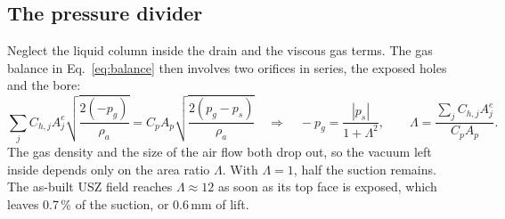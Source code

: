 \documentclass[10pt,a4paper]{article}
\begin{document}
\subsection{The pressure divider}
Neglect the liquid column inside the drain and the viscous gas terms. The gas balance in Eq.~\eqref{eq:balance} then involves two orifices in series, the exposed holes and the bore:
\[
\sum_j C_{h,j}A^e_j\sqrt{\frac{2(-p_g)}{\rho_a}} = C_pA_p\sqrt{\frac{2(p_g-p_s)}{\rho_a}}
\quad\Longrightarrow\quad
-p_g = \frac{|p_s|}{1+\Lambda^2},\qquad
\Lambda=\frac{\sum_j C_{h,j}A^e_j}{C_pA_p}.
\]
The gas density and the size of the air flow both drop out, so the vacuum left inside depends only on the area ratio $\Lambda$. With $\Lambda=1$, half the suction remains. The as-built USZ field reaches $\Lambda\approx12$ as soon as its top face is exposed, which leaves 0.7\,\% of the suction, or 0.6\,mm of lift.
\end{document}
